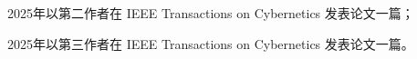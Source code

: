 
\begin{achievements}


\begin{theachievements}[已发表论文]
  \item 2025年以第二作者在 IEEE Transactions on Cybernetics 发表论文一篇；
  \item 2025年以第三作者在 IEEE Transactions on Cybernetics 发表论文一篇。
\end{theachievements}





\end{achievements}

